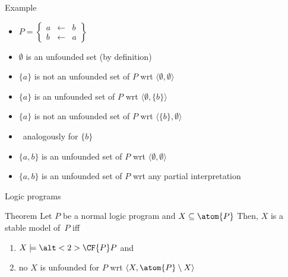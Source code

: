 \begin{frame}{Example}
  \bigskip
  \begin{itemize}
  \item<1->
    \(
    P
    =
    \left\{
      \begin{array}{lcl}
        a &\leftarrow & b \\
        b &\leftarrow & a
      \end{array}
    \right\}
    \)
    \bigskip
  \item<2-> $\emptyset$ is an unfounded set (by definition)
    \smallskip
  \item<3-> $\{a\}$ is not an unfounded set of $P$ wrt $\langle\emptyset,\emptyset\rangle$
  \item<4-> $\{a\}$ is     an unfounded set of $P$ wrt $\langle\emptyset,\{b\}\rangle$
  \item<5-> $\{a\}$ is not an unfounded set of $P$ wrt $\langle\{b\},\emptyset\rangle$
    \smallskip
  \item<6>[]\itarrow\ analogously for $\{b\}$
    \smallskip
  \item<7-> $\{a,b\}$ is     an unfounded set of $P$ wrt $\langle\emptyset,\emptyset\rangle$
  \item<8-> $\{a,b\}$ is     an unfounded set of $P$ wrt any partial interpretation
  \end{itemize}
\end{frame}
\begin{frame}{Logic programs}
  \bigskip
  \begin{center}
    \begin{minipage}[t]{0.92\linewidth}
      \begin{block}{ Theorem}
        \smallskip
        Let $P$ be a normal logic program and $X\subseteq\atom{P}$
        Then, $X$ is a stable model of~$P$ iff
        \begin{enumerate}
        \item $X\models\alt<2>{\CF{P}}{P}$ and
        \item no  $X$ is unfounded for $P$ wrt $\langle X,\atom{P}\setminus X \rangle$
        \end{enumerate}
      \end{block}
    \end{minipage}
  \end{center}
  \nocite{saczan90a,lee05a}
\end{frame}
